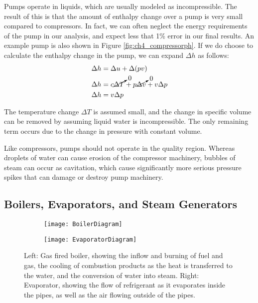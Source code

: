 Pumps operate in liquids, which are usually modeled as incompressible.  The result of this is that the amount of enthalpy change over a pump is very small compared to compressors.  In fact, we can often neglect the energy requirements of the pump in our analysis, and expect less that 1\% error in our final results.  An example pump is also shown in Figure \ref{fig:ch4_compressorph}.  If we do choose to calculate the enthalpy change in the pump, we can expand $\Delta h$ as follows:
\begin{align}
  \nonumber \Delta h &= \Delta u + \Delta (pv) \\
  \nonumber \Delta h &= c \cancelto{0}{\Delta T} + p\cancelto{0}{\Delta v} + v\Delta p \\
\label{eq:ch4_pumpEnthalpy} \Delta h &= v\Delta p
\end{align}

The temperature change $\Delta T$ is assumed small, and the change in specific volume can be removed by assuming liquid water is incompressible.  The only remaining term occurs due to the change in pressure with constant volume.

Like compressors, pumps should not operate in the quality region.  Whereas droplets of water can cause erosion of the compressor machinery, bubbles of steam can occur as cavitation, which cause significantly more serious pressure spikes that can damage or destroy pump machinery.

\subsection{Boilers, Evaporators, and Steam Generators}  \label{sec:ch4_boilers}

\begin{figure}[H]
  \centering
  \begin{subfigure}[b]{0.55\textwidth}
    \centering
    \texttt{[image: BoilerDiagram]}
   
  \end{subfigure}
  \hfill
  \begin{subfigure}[b]{0.42\textwidth}
    \centering
    \texttt{[image: EvaporatorDiagram]}
  \end{subfigure}
   \caption{Left: Gas fired boiler, showing the inflow and burning of fuel and gas, the cooling of combustion products as the heat is transferred to the water, and the conversion of water into steam. Right: Evaporator, showing the flow of refrigerant as it evaporates inside the pipes, as well as the air flowing outside of the pipes.}
\label{fig:ch4_boilerDiagram}
\end{figure}

